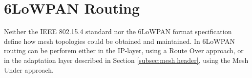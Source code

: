 \chapter{6LoWPAN Routing}\label{ch:routing}
Neither the IEEE 802.15.4 \cite{ieee802.15.4} standard nor the 6LoWPAN format specification \cite{rfc4944} define how mesh topologies could be obtained and maintained. In 6LoWPAN routing can be perforem either in the IP-layer, using a Route Over approach, or in the adaptation layer described in Section \ref{subsec:mesh.header}, using the Mesh Under approach.


